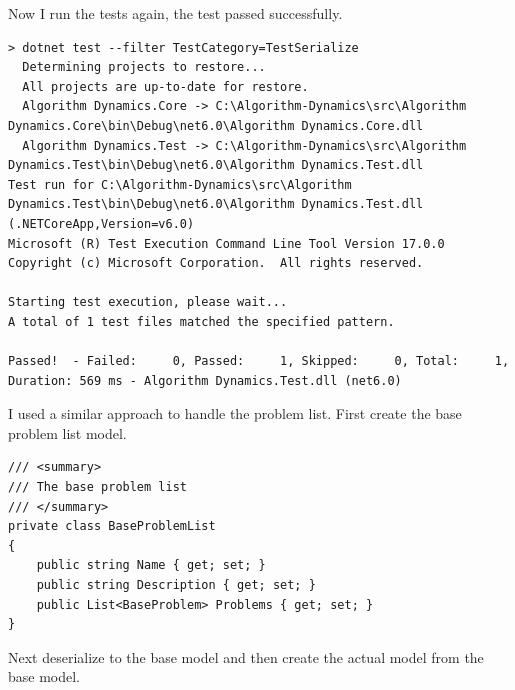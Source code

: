\documentclass[a4paper]{report}
\begin{document}
Now I run the tests again, the test passed successfully.

\begin{verbatim}
> dotnet test --filter TestCategory=TestSerialize
  Determining projects to restore...
  All projects are up-to-date for restore.
  Algorithm Dynamics.Core -> C:\Algorithm-Dynamics\src\Algorithm Dynamics.Core\bin\Debug\net6.0\Algorithm Dynamics.Core.dll
  Algorithm Dynamics.Test -> C:\Algorithm-Dynamics\src\Algorithm Dynamics.Test\bin\Debug\net6.0\Algorithm Dynamics.Test.dll
Test run for C:\Algorithm-Dynamics\src\Algorithm Dynamics.Test\bin\Debug\net6.0\Algorithm Dynamics.Test.dll (.NETCoreApp,Version=v6.0)
Microsoft (R) Test Execution Command Line Tool Version 17.0.0
Copyright (c) Microsoft Corporation.  All rights reserved.

Starting test execution, please wait...
A total of 1 test files matched the specified pattern.

Passed!  - Failed:     0, Passed:     1, Skipped:     0, Total:     1, Duration: 569 ms - Algorithm Dynamics.Test.dll (net6.0)
\end{verbatim}

I used a similar approach to handle the problem list. First create the base problem list model.

\begin{verbatim}
/// <summary>
/// The base problem list 
/// </summary>
private class BaseProblemList
{
    public string Name { get; set; }
    public string Description { get; set; }
    public List<BaseProblem> Problems { get; set; }
}
\end{verbatim}

Next deserialize to the base model and then create the actual model from the base model.
\end{document}
